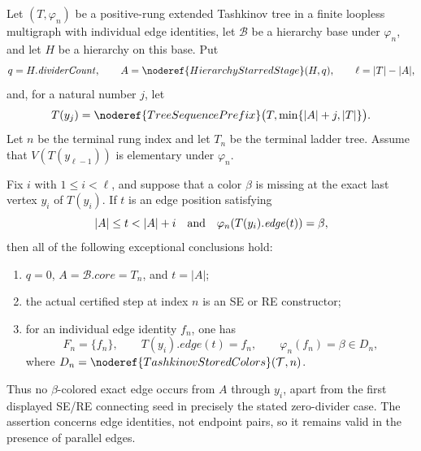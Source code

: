 \begin{lemma}
Let $(T,\varphi_n)$ be a positive-rung extended Tashkinov tree in a
finite loopless multigraph with individual edge identities, let
$\mathcal B$ be a hierarchy base under $\varphi_n$, and let $H$ be a
hierarchy on this base.  Put
\[
 q=H.\mathit{dividerCount},\qquad
 A=\noderef{HierarchyStarredStage}(H,q),\qquad
 \ell=|T|-|A|,
\]
and, for a natural number $j$, let
\[
 T(y_j)=\noderef{TreeSequencePrefix}
       \bigl(T,\min\{|A|+j,|T|\}\bigr).
\]
Let $n$ be the terminal rung index and let $T_n$ be the terminal ladder
tree.  Assume that $V(T(y_{\ell-1}))$ is elementary under $\varphi_n$.

Fix $i$ with $1\leq i<\ell$, and suppose that a color $\beta$ is missing
at the exact last vertex $y_i$ of $T(y_i)$.  If $t$ is an edge position
satisfying
\[
             |A|\leq t<|A|+i
 \quad\hbox{and}\quad
             \varphi_n(T(y_i).\mathit{edge}(t))=\beta,
\]
then all of the following exceptional conclusions hold:
\begin{enumerate}
\item $q=0$, $A=\mathcal B.\mathit{core}=T_n$, and $t=|A|$;
\item the actual certified step at index $n$ is an SE or RE constructor;
\item for an individual edge identity $f_n$, one has
\[
 F_n=\{f_n\},\qquad
 T(y_i).\mathit{edge}(t)=f_n,\qquad
 \varphi_n(f_n)=\beta\in D_n,
\]
where $D_n=\noderef{TashkinovStoredColors}(\mathcal T,n)$.
\end{enumerate}
Thus no $\beta$-colored exact edge occurs from $A$ through $y_i$, apart
from the first displayed SE/RE connecting seed in precisely the stated
zero-divider case.  The assertion concerns edge identities, not endpoint
pairs, so it remains valid in the presence of parallel edges.
\end{lemma}
